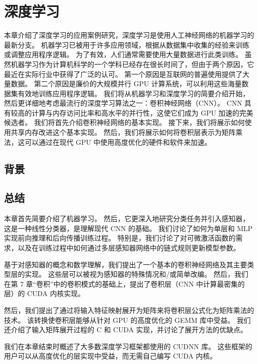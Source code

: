 \section{深度学习}
本章介绍了深度学习的应用案例研究，深度学习是使用人工神经网络的机器学习的最新分支。 机器学习已被用于许多应用领域，根据从数据集中收集的经验来训练或调整应用程序逻辑。 为了有效，人们通常需要使用大量数据进行此类训练。 虽然机器学习作为计算机科学的一个学科已经存在很长时间了，但由于两个原因，它最近在实际行业中获得了广泛的认可。 第一个原因是互联网的普遍使用提供了大量数据。 第二个原因是廉价的大规模并行 GPU 计算系统，可以利用这些海量数据集有效地训练应用程序逻辑。 我们将从机器学习和深度学习的简要介绍开始，然后更详细地考虑最流行的深度学习算法之一：卷积神经网络（CNN）。 CNN 具有较高的计算与内存访问比率和高水平的并行性，这使它们成为 GPU 加速的完美候选者。 我们将首先介绍卷积神经网络的基本实现。 接下来，我们将展示如何使用共享内存改进这个基本实现。 然后，我们将展示如何将卷积层表示为矩阵乘法，这可以通过在现代 GPU 中使用高度优化的硬件和软件来加速。

\subsection{背景}

\subsection{总结}
本章首先简要介绍了机器学习。 然后，它更深入地研究分类任务并引入感知器，这是一种线性分类器，是理解现代 CNN 的基础。 我们讨论了如何为单层和 MLP 实现前向推理和后向传播训练过程。 特别是，我们讨论了对可微激活函数的需求，以及在训练过程中如何通过多层感知器网络中的链式规则更新模型参数。

基于对感知器的概念和数学理解，我们提出了一个基本的卷积神经网络及其主要类型层的实现。 这些层可以被视为感知器的特殊情况和/或简单改编。 然后，我们在第 7 章“卷积”中的卷积模式的基础上，提出了卷积层（CNN 中计算最密集的层）的 CUDA 内核实现。

然后，我们提出了通过将输入特征映射展开为矩阵来将卷积层公式化为矩阵乘法的技术。 该转换使卷积层能够从针对 GPU 的高度优化的 GEMM 库中受益。 我们还介绍了输入矩阵展开过程的 C 和 CUDA 实现，并讨论了展开方法的优缺点。

我们在本章结束时概述了大多数深度学习框架都使用的 CUDNN 库。 这些框架的用户可以从高度优化的层实现中受益，而无需自己编写 CUDA 内核。